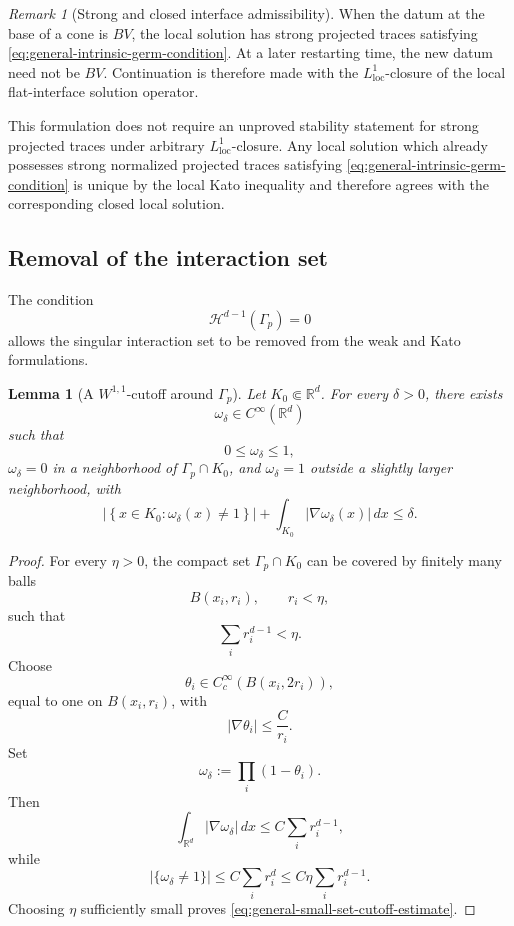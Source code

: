 \documentclass[11pt]{amsart}
\numberwithin{equation}{section}
\theoremstyle{plain}
\newtheorem{lemma}[theorem]{Lemma}
\theoremstyle{definition}
\theoremstyle{remark}
\newtheorem{remark}[theorem]{Remark}
\begin{document}
\begin{remark}[Strong and closed interface admissibility]
\label{rem:general-strong-versus-closed}
When the datum at the base of a cone is \(BV\), the local solution has strong
projected traces satisfying
\eqref{eq:general-intrinsic-germ-condition}. At a later restarting time, the
new datum need not be \(BV\). Continuation is therefore made with the
\(L^1_{\mathrm{loc}}\)-closure of the local flat-interface solution
operator.

This formulation does not require an unproved stability statement for strong
projected traces under arbitrary \(L^1_{\mathrm{loc}}\)-closure. Any local
solution which already possesses strong normalized projected traces satisfying
\eqref{eq:general-intrinsic-germ-condition} is unique by the local Kato
inequality and therefore agrees with the corresponding closed local
solution.
\end{remark}

\subsection{Removal of the interaction set}
\label{subsec:general-removal}

The condition
\[
    \mathcal H^{d-1}(\Gamma_p)=0
\]
allows the singular interaction set to be removed from the weak and Kato
formulations.

\begin{lemma}[A \(W^{1,1}\)-cutoff around \(\Gamma_p\)]
\label{lem:general-small-set-cutoff}
Let \(K_0\Subset\mathbb R^d\). For every \(\delta>0\), there exists
\[
    \omega_\delta\in C^\infty(\mathbb R^d)
\]
such that
\[
    0\le\omega_\delta\le1,
\]
\(\omega_\delta=0\) in a neighborhood of
\(\Gamma_p\cap K_0\), and \(\omega_\delta=1\) outside a slightly larger
neighborhood, with
\begin{equation}
\label{eq:general-small-set-cutoff-estimate}
\left|
    \left\{
        x\in K_0:
        \omega_\delta(x)\neq1
    \right\}
\right|
+
\int_{K_0}
    |\nabla\omega_\delta(x)|
\,dx
\le\delta.
\end{equation}
\end{lemma}

\begin{proof}
For every \(\eta>0\), the compact set
\(\Gamma_p\cap K_0\) can be covered by finitely many balls
\[
    B(x_i,r_i),
    \qquad
    r_i<\eta,
\]
such that
\[
    \sum_i r_i^{d-1}<\eta.
\]
Choose
\[
    \theta_i\in C_c^\infty(B(x_i,2r_i)),
\]
equal to one on \(B(x_i,r_i)\), with
\[
    |\nabla\theta_i|\le \frac{C}{r_i}.
\]
Set
\[
    \omega_\delta
    :=
    \prod_i(1-\theta_i).
\]
Then
\[
    \int_{\mathbb R^d}
        |\nabla\omega_\delta|
    \,dx
    \le
    C\sum_i r_i^{d-1},
\]
while
\[
    |\{\omega_\delta\neq1\}|
    \le
    C\sum_i r_i^d
    \le
    C\eta\sum_i r_i^{d-1}.
\]
Choosing \(\eta\) sufficiently small proves
\eqref{eq:general-small-set-cutoff-estimate}.
\end{proof}
\end{document}
